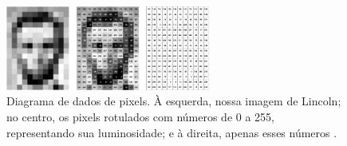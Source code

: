 \begin{figure}[!ht]
	\centering
	\includegraphics[width=0.6\textwidth]{figures/lincoln_pixel_values.png}
	\caption{Diagrama de dados de pixels. À esquerda, nossa imagem de Lincoln; no centro, os pixels rotulados com números de 0 a 255, representando sua luminosidade; e à direita, apenas esses números \cite{content_Human_Vision}.}
	\label{fig:comp_vision}
\end{figure}



